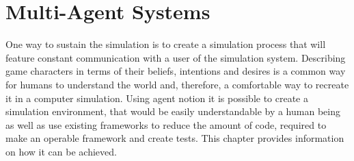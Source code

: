 \chapter{Multi-Agent Systems}
One way to sustain the simulation is to create a simulation process that will feature constant communication with a user of the simulation system.
Describing game characters in terms of their beliefs, intentions and desires is a common way for humans to understand the world and, therefore, a comfortable way to recreate it in a computer simulation. Using agent notion it is possible to create a simulation environment, that would be easily understandable by a human being as well as use existing frameworks to reduce the amount of code, required to make an operable framework and create tests. This chapter provides information on how it can be achieved.\par




%





